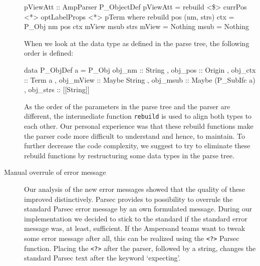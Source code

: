 \begin{description}
   \begin{haskell}
  pViewAtt :: AmpParser P_ObjectDef
  pViewAtt = rebuild <\$> currPos <*> optLabelProps <*> pTerm
      where rebuild pos (nm, strs) ctx = P_Obj nm pos ctx mView msub strs
            mView = Nothing
            msub  = Nothing
   \end{haskell}
 
   When we look at the data type as defined in the parse tree, the following order is defined:
   \begin{haskell}
 data P_ObjDef a =
    P_Obj { obj_nm :: String          
               , obj_pos :: Origin  
               , obj_ctx :: Term a
               , obj_mView :: Maybe String 
               , obj_msub :: Maybe (P_SubIfc a)  
               , obj_strs :: [[String]]
               }
    \end{haskell}

    As the order of the parameters in the parse tree and the parser are different, the intermediate function \texttt{rebuild} is used to align both types to each other.
   Our personal experience was that these rebuild functions make the parser code more difficult to understand and hence, to maintain.
   To further decrease the code complexity, we suggest to try to eliminate these rebuild functions by restructuring some data types in the parse tree.

  \item[Manual overrule of error message]
    Our analysis of the new error messages showed that the quality of these improved distinctively.
    Parsec provides to possibility to overrule the standard Parsec error message by an own formulated message.
    During our implementation we decided to stick to the standard if the standard error message was, at least, sufficient.
    If the Ampersand teams want to tweak some error message after all, this can be realized using the \texttt{<?>} Parsec function.
    Placing the \texttt{<?>} after the parser, followed by a string, changes the standard Parsec text after the keyword `expecting'.

\end{description}
